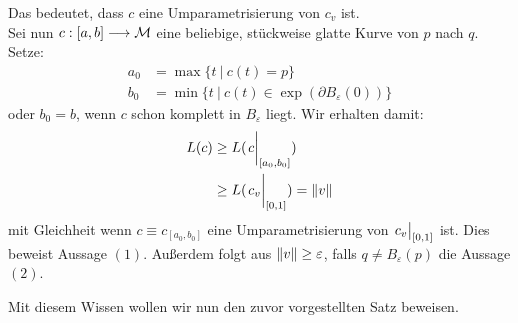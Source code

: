 \begin{bew}
 Das bedeutet, dass $c$ eine Umparametrisierung von $c_v$ ist. \\
Sei nun $c:[a, b] \longrightarrow \mathcal{M}$ eine beliebige, stückweise glatte Kurve von $p$ nach $q$. \\
Setze: 
\begin{align*}
a_0 &= \max\{t \ | \ c(t) = p\} \\
b_0 &= \min\{t \ | \ c(t) \in \exp(\partial B_{\varepsilon}(0))\}
\end{align*}
oder $b_0=b$, wenn $c$ schon komplett in $B_{\varepsilon}$ liegt.
Wir erhalten damit:
\begin{align}
L(c) &\geq L(\eval{c}_{[a_0, b_0]})  \nonumber \\
&\geq L(\eval{c_v}_{[0, 1]}) = \norm{v}
\end{align}
mit Gleichheit wenn $c \equiv c_{[a_0, b_0]}$ eine Umparametrisierung von $\eval{c_v}_{[0, 1]}$ ist. Dies beweist Aussage $(1)$. Außerdem folgt aus $\norm{v} \geq \varepsilon$, falls $q\neq B_{\varepsilon}(p)$ die Aussage $(2)$.
\end{bew}
Mit diesem Wissen wollen wir nun den zuvor vorgestellten Satz beweisen.
